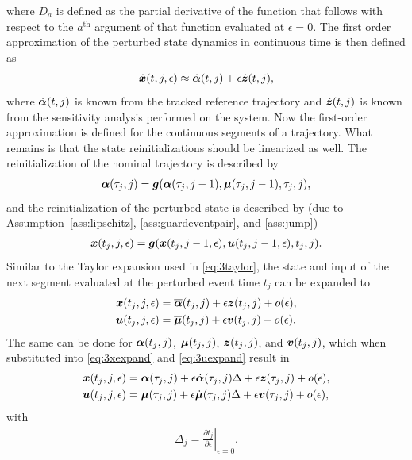\documentclass[../DC2017114Bouma.tex]{subfiles}
\begin{document}
where $D_a$ is defined as the partial derivative of the function that follows with respect to the $a^{\text{th}}$ argument of that function evaluated at $\epsilon = 0$. The first order approximation of the perturbed state dynamics in continuous time is then defined as
\begin{align}
\dot{{\boldsymbol{x}}}(t,j,\epsilon) \approx \dot{\boldsymbol{\alpha}}(t,j) + \epsilon\dot{{\boldsymbol{z}}}(t,j),
\end{align}
where $\dot{\boldsymbol{\alpha}}(t,j)$ is known from the tracked reference trajectory and $\dot{{\boldsymbol{z}}}(t,j)$ is known from the sensitivity analysis performed on the system. Now the first-order approximation is defined for the continuous segments of a trajectory. What remains is that the state reinitializations should be linearized as well. The reinitialization of the nominal trajectory is described by
\begin{align}
\boldsymbol{\alpha}(\tau_j,j) = {\boldsymbol{g}}(\boldsymbol{\alpha}(\tau_j,j-1),\boldsymbol{\mu}(\tau_j,j-1),\tau_j,j),\label{eq:3g}
\end{align}
and the reinitialization of the perturbed state is described by (due to Assumption~\ref{ass:lipschitz}, \ref{ass:guardeventpair}, and \ref{ass:jump})
\begin{align}
{\boldsymbol{x}}(t_{j},j,\epsilon) = {\boldsymbol{g}}({\boldsymbol{x}}(t_{j},j-1,\epsilon),{\boldsymbol{u}}(t_{j},j-1,\epsilon),t_{j},j).
\end{align}
Similar to the Taylor expansion used in \eqref{eq:3taylor}, the state and input of the next segment evaluated at the perturbed event time $t_{j}$ can be expanded to
\begin{align}
{\boldsymbol{x}}(t_{j},j,\epsilon) &= \overline{\boldsymbol{\alpha}}(t_{j},j) + \epsilon{\boldsymbol{z}}(t_{j},j) + o(\epsilon),\label{eq:3xexpand}\\
{\boldsymbol{u}}(t_{j},j,\epsilon) &= \overline{\boldsymbol{\mu}}(t_{j},j) + \epsilon{\boldsymbol{v}}(t_{j},j) + o(\epsilon).\label{eq:3uexpand}
\end{align}
The same can be done for $\boldsymbol{\alpha}(t_{j},j)$, $\boldsymbol{\mu}(t_{j},j)$, ${\boldsymbol{z}}(t_{j},j)$, and ${\boldsymbol{v}}(t_{j},j)$, which when substituted into \eqref{eq:3xexpand} and \eqref{eq:3uexpand} result in
\begin{align}
{\boldsymbol{x}}(t_{j},j,\epsilon) &= \boldsymbol{\alpha}(\tau_j,j) + \epsilon\dot{\boldsymbol{\alpha}}(\tau_j,j)\Delta + \epsilon{\boldsymbol{z}}(\tau_j,j) + o(\epsilon),\label{eq:3xexpand2}\\
{\boldsymbol{u}}(t_{j},j,\epsilon) &= \boldsymbol{\mu}(\tau_j,j) + \epsilon\dot{\boldsymbol{\mu}}(\tau_j,j)\Delta + \epsilon{\boldsymbol{v}}(\tau_j,j) + o(\epsilon),\label{eq:3uexpand2}
\end{align}
with
\begin{align}
\Delta_{j} = \left.\frac{\partial t_{j}}{\partial\epsilon}\right|_{\epsilon=0}.\label{eq:3Delta}
\end{align}
\end{document}
